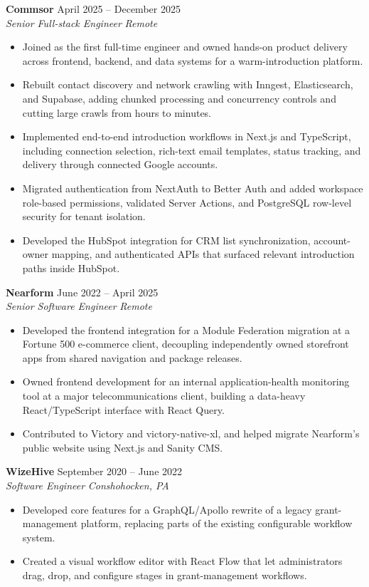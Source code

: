 \documentclass[10pt,letterpaper]{article}
\newcommand{\role}[4]{%
  \Needspace{2.5\baselineskip}%
  \textbf{#1} \hfill #2\\[-2pt]
  \textit{#3} \hfill \textit{#4}\\[-4.4pt]
}
\begin{document}
\role{Commsor}{April 2025 -- December 2025}{Senior Full-stack Engineer}{Remote}
\begin{itemize}
  \item Joined as the first full-time engineer and owned hands-on product delivery across frontend, backend, and data systems for a warm-introduction platform.
  \item Rebuilt contact discovery and network crawling with Inngest, Elasticsearch, and Supabase, adding chunked processing and concurrency controls and cutting large crawls from hours to minutes.
  \item Implemented end-to-end introduction workflows in Next.js and TypeScript, including connection selection, rich-text email templates, status tracking, and delivery through connected Google accounts.
  \item Migrated authentication from NextAuth to Better Auth and added workspace role-based permissions, validated Server Actions, and PostgreSQL row-level security for tenant isolation.
  \item Developed the HubSpot integration for CRM list synchronization, account-owner mapping, and authenticated APIs that surfaced relevant introduction paths inside HubSpot.
\end{itemize}

\role{Nearform}{June 2022 -- April 2025}{Senior Software Engineer}{Remote}
\begin{itemize}
  \item Developed the frontend integration for a Module Federation migration at a Fortune 500 e-commerce client, decoupling independently owned storefront apps from shared navigation and package releases.
  \item Owned frontend development for an internal application-health monitoring tool at a major telecommunications client, building a data-heavy React/TypeScript interface with React Query.
  \item Contributed to Victory and victory-native-xl, and helped migrate Nearform's public website using Next.js and Sanity CMS.
\end{itemize}

\role{WizeHive}{September 2020 -- June 2022}{Software Engineer}{Conshohocken, PA}
\begin{itemize}
  \item Developed core features for a GraphQL/Apollo rewrite of a legacy grant-management platform, replacing parts of the existing configurable workflow system.
  \item Created a visual workflow editor with React Flow that let administrators drag, drop, and configure stages in grant-management workflows.
\end{itemize}
\end{document}
